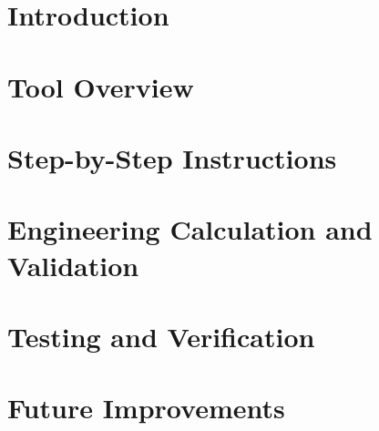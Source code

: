 \documentclass[11pt]{article}
\begin{document}

\setcounter{page}{1}
\tableofcontents
\pagebreak

\section{Introduction}

\section{Tool Overview}

\section{Step-by-Step Instructions}

\section{Engineering Calculation and Validation}

\section{Testing and Verification}

\section{Future Improvements}

\end{document}
